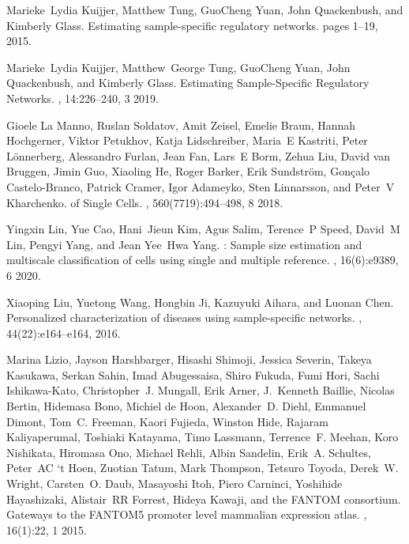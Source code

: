 \documentclass[10pt, a4paper]{article}
\begin{document}
\begin{thebibliography}{10}
	Marieke~Lydia Kuijjer, Matthew Tung, GuoCheng Yuan, John Quackenbush, and
	Kimberly Glass.
	\newblock Estimating sample-specific regulatory networks.
	\newblock pages 1--19, 2015.
	
	Marieke~Lydia Kuijjer, Matthew~George Tung, GuoCheng Yuan, John Quackenbush,
	and Kimberly Glass.
	\newblock Estimating {{Sample}}-{{Specific Regulatory Networks}}.
	, 14:226--240, 3 2019.
	
	Gioele {La Manno}, Ruslan Soldatov, Amit Zeisel, Emelie Braun, Hannah
	Hochgerner, Viktor Petukhov, Katja Lidschreiber, Maria~E Kastriti, Peter
	L{\"o}nnerberg, Alessandro Furlan, Jean Fan, Lars~E Borm, Zehua Liu, David
	{van Bruggen}, Jimin Guo, Xiaoling He, Roger Barker, Erik Sundstr{\"o}m,
	Gon{\c c}alo Castelo-Branco, Patrick Cramer, Igor Adameyko, Sten Linnarsson,
	and Peter~V Kharchenko.
	 of {{Single Cells}}.
	, 560(7719):494--498, 8 2018.
	
	Yingxin Lin, Yue Cao, Hani~Jieun Kim, Agus Salim, Terence~P Speed, David~M Lin,
	Pengyi Yang, and Jean Yee~Hwa Yang.
	: Sample size estimation and multiscale classification
	of cells using single and multiple reference.
	, 16(6):e9389, 6 2020.
	
	Xiaoping Liu, Yuetong Wang, Hongbin Ji, Kazuyuki Aihara, and Luonan Chen.
	\newblock Personalized characterization of diseases using sample-specific
	networks.
	, 44(22):e164--e164, 2016.
	
	Marina Lizio, Jayson Harshbarger, Hisashi Shimoji, Jessica Severin, Takeya
	Kasukawa, Serkan Sahin, Imad Abugessaisa, Shiro Fukuda, Fumi Hori, Sachi
	Ishikawa-Kato, Christopher~J. Mungall, Erik Arner, J.~Kenneth Baillie,
	Nicolas Bertin, Hidemasa Bono, Michiel {de Hoon}, Alexander~D. Diehl,
	Emmanuel Dimont, Tom~C. Freeman, Kaori Fujieda, Winston Hide, Rajaram
	Kaliyaperumal, Toshiaki Katayama, Timo Lassmann, Terrence~F. Meehan, Koro
	Nishikata, Hiromasa Ono, Michael Rehli, Albin Sandelin, Erik~A. Schultes,
	Peter~AC {`t Hoen}, Zuotian Tatum, Mark Thompson, Tetsuro Toyoda, Derek~W.
	Wright, Carsten~O. Daub, Masayoshi Itoh, Piero Carninci, Yoshihide
	Hayashizaki, Alistair~RR Forrest, Hideya Kawaji, and {the FANTOM consortium}.
	\newblock Gateways to the {{FANTOM5}} promoter level mammalian expression
	atlas.
	, 16(1):22, 1 2015.
	

\end{thebibliography}
\end{document}
